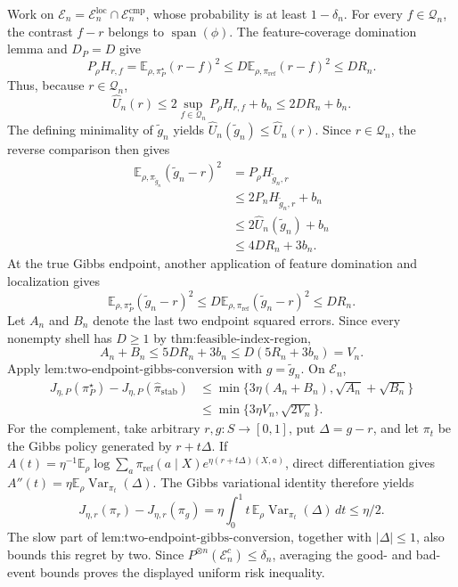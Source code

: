 Work on \(\mathcal E_n=\mathcal E_n^{\mathrm{loc}}\cap\mathcal E_n^{\mathrm{cmp}}\), whose probability is at least \(1-\delta_n\). For every \(f\in\mathcal Q_n\), the contrast \(f-r\) belongs to \(\operatorname{span}(\phi)\). The feature-coverage domination lemma and \(D_P=D\) give
\[
P_\rho H_{r,f}
=\mathbb E_{\rho,\pi_P^\star}(r-f)^2
\le D\mathbb E_{\rho,\pi_{\mathrm{ref}}}(r-f)^2
\le DR_n.
\]
Thus, because \(r\in\mathcal Q_n\),
\[
\widehat U_n(r)
\le2\sup_{f\in\mathcal Q_n}P_\rho H_{r,f}+b_n
\le2DR_n+b_n.
\]
The defining minimality of \(\widetilde g_n\) yields \(\widehat U_n(\widetilde g_n)\le\widehat U_n(r)\). Since \(r\in\mathcal Q_n\), the reverse comparison then gives
\[
\begin{aligned}
\mathbb E_{\rho,\pi_{\widetilde g_n}}(\widetilde g_n-r)^2
&=P_\rho H_{\widetilde g_n,r}\\
&\le2P_nH_{\widetilde g_n,r}+b_n\\
&\le2\widehat U_n(\widetilde g_n)+b_n\\
&\le4DR_n+3b_n.
\end{aligned}
\]
At the true Gibbs endpoint, another application of feature domination and localization gives
\[
\mathbb E_{\rho,\pi_P^\star}(\widetilde g_n-r)^2
\le D\mathbb E_{\rho,\pi_{\mathrm{ref}}}(\widetilde g_n-r)^2
\le DR_n.
\]
Let \(A_n\) and \(B_n\) denote the last two endpoint squared errors. Since every nonempty shell has \(D\ge1\) by \(\text{thm:feasible-index-region}\),
\[
A_n+B_n\le5DR_n+3b_n
\le D(5R_n+3b_n)=V_n.
\]
Apply \(\text{lem:two-endpoint-gibbs-conversion}\) with \(g=\widetilde g_n\). On \(\mathcal E_n\),
\[
\begin{aligned}
J_{\eta,P}(\pi_P^\star)-J_{\eta,P}(\widehat\pi_{\mathrm{stab}})
&\le\min\{3\eta(A_n+B_n),\sqrt{A_n}+\sqrt{B_n}\}\\
&\le\min\{3\eta V_n,\sqrt{2V_n}\}.
\end{aligned}
\]
For the complement, take arbitrary \(r,g:S\to[0,1]\), put \(\Delta=g-r\), and let \(\pi_t\) be the Gibbs policy generated by \(r+t\Delta\). If \(A(t)=\eta^{-1}\mathbb E_\rho\log\sum_a\pi_{\mathrm{ref}}(a\mid X)e^{\eta(r+t\Delta)(X,a)}\), direct differentiation gives \(A''(t)=\eta\mathbb E_\rho\operatorname{Var}_{\pi_t}(\Delta)\). The Gibbs variational identity therefore yields
\[
J_{\eta,r}(\pi_r)-J_{\eta,r}(\pi_g)
=\eta\int_0^1t\,\mathbb E_\rho\operatorname{Var}_{\pi_t}(\Delta)\,dt
\le\eta/2.
\]
The slow part of \(\text{lem:two-endpoint-gibbs-conversion}\), together with \(|\Delta|\le1\), also bounds this regret by two. Since \(P^{\otimes n}(\mathcal E_n^c)\le\delta_n\), averaging the good- and bad-event bounds proves the displayed uniform risk inequality.

